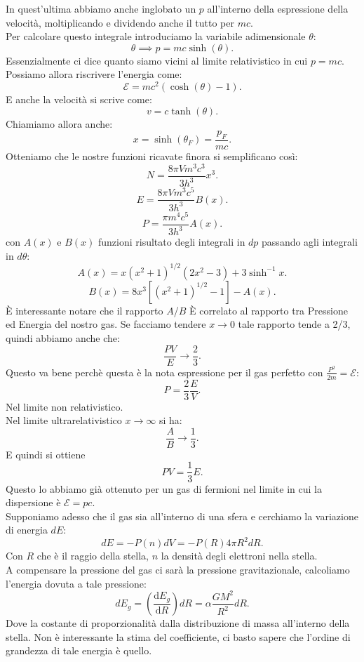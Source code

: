 In quest'ultima abbiamo anche inglobato un $p$ all'interno della espressione della velocità, moltiplicando e dividendo anche il tutto per $mc$.\\
Per calcolare questo integrale introduciamo la variabile adimensionale $\theta $:
\[
	\theta \implies p = mc\sinh( \theta ) 
.\] 
Essenzialmente ci dice quanto siamo vicini al limite relativistico in cui $p = mc$. Possiamo allora riscrivere l'energia come:
\[
	\mathcal{E} = mc^2\left( \cosh( \theta ) -1  \right) 
.\] 
E anche la velocità si scrive come:
\[
	v = c \tanh( \theta ) 
.\] 
Chiamiamo allora anche:
\[
	x = \sinh( \theta_{F})  = \frac{p_{F}}{mc}
.\] 
Otteniamo che le nostre funzioni ricavate finora si semplificano così:
\[
	N = \frac{8\pi V m^3c^3}{3h^3}x^3
.\] 
\[
	E = \frac{8\pi V m^3c^5}{3h^3}B (x ) 
.\] 
\[
	P = \frac{\pi m^{4}c ^{5}}{3h^3}A ( x) 
.\] 
con $A( x) $ e $B ( x)$ funzioni risultato degli integrali in $dp$ passando agli integrali in $d\theta $:
\[
	A( x) = x\left( x^2+1 \right) ^{1 /2}\left( 2x^2 - 3 \right) + 3 \sinh^{-1}x 
.\] 
\[
	B( x) = 8x^3\left[ \left( x^2+ 1 \right)^{1 /2}-1 \right] - A( x) 
.\] 
È interessante notare che il rapporto $A$/$B$ È correlato al rapporto tra Pressione ed Energia del nostro gas. Se facciamo tendere $x \to 0$ tale rapporto tende a 2/3, quindi abbiamo anche che:
\[
	\frac{PV}{E} \to  \frac{2}{3}
.\] 
Questo va bene perchè questa è la nota espressione per il gas perfetto con $\frac{P^2}{2m} = \mathcal{E} $:
\[
	P = \frac{2}{3}\frac{E}{V}
.\] 
Nel limite non relativistico. \\
Nel limite ultrarelativistico $x \to \infty $ si ha:
\[
	\frac{A}{B} \to \frac{1}{3}
.\] 
E quindi si ottiene 
\[
	PV = \frac{1}{3}E
.\] 
Questo lo abbiamo già ottenuto per un gas di fermioni nel limite in cui la dispersione è $\mathcal{E} = pc$.\\
Supponiamo adesso che il gas sia all'interno di una sfera e cerchiamo la variazione di energia $dE$:
\[
	dE = - P( n) dV = -P( R) 4\pi R^2dR
.\] 
Con $R$ che è il raggio della stella, $n$ la densità degli elettroni nella stella. \\
A compensare la pressione del gas ci sarà la pressione gravitazionale, calcoliamo l'energia dovuta a tale pressione:
\[
	dE_{g}= \left( \frac{\mbox{d} E_{g}}{\mbox{d} R}  \right) dR = 
	\alpha \frac{GM^2}{R^2}dR
.\] 
Dove la costante di proporzionalità dalla distribuzione di massa all'interno della stella. Non è interessante la stima del coefficiente, ci basto sapere che l'ordine di grandezza di tale energia è quello.\\
